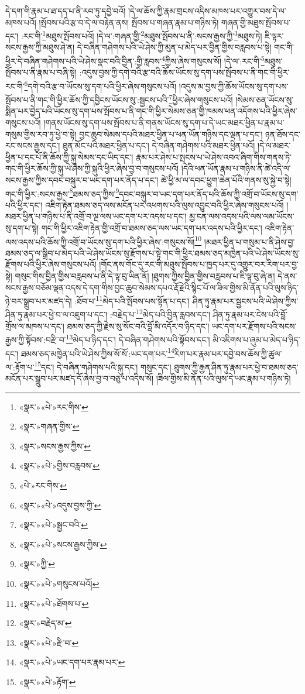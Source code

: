 དེ་དག་གི་རྣམ་པ་ཐ་དད་པ་ནི་རབ་ཏུ་དབྱེ་བའོ། །དེ་ལ་ཆོས་ཀྱི་རྣམ་གྲངས་འདིས་མཁས་པར་འགྱུར་བས་དེ་ལ་མཁས་པའོ། །སྤོབས་པའི་རྩ་བ་དེ་ལ་བརྟེན་ནས། སྤོབས་པ་གཞན་རྣམ་པ་གཉིས་ཏེ། གཞན་གྱི་མཐུས་སྤོབས་པ་དང་། :རང་གི་\footnote{«སྣར་»«པེ་»རང་གིས་}མཐུས་སྤོབས་པའོ། །དེ་ལ་:གཞན་གྱི་\footnote{«སྣར་»གཞན་གྱིས་}མཐུས་སྤོབས་པ་ནི་:སངས་རྒྱས་ཀྱི་\footnote{«སྣར་»སངས་རྒྱས་ཀྱིས་}མཐུས་ཏེ། ཇི་ལྟར་སངས་རྒྱས་ཀྱི་མཐུས་ཤེ་ན། དེ་བཞིན་གཤེགས་པའི་ཡེ་ཤེས་ཀྱི་མུན་པ་མེད་པར་བྱིན་གྱིས་བརླབས་པ་སྟེ། གང་གི་ཕྱིར་དེ་བཞིན་གཤེགས་པའི་ཡེ་ཤེས་སྣང་བའི་བྱིན་:གྱི་རླབས་\footnote{«སྣར་»«པེ་»གྱིས་བརླབས་}ཀྱིས་ཞེས་གསུངས་སོ། །དེ་ལ་:རང་གི་\footnote{«པེ་»རང་གིས་}མཐུས་སྤོབས་པ་ནི་རྣམ་པ་བཞི་སྟེ། :འདུས་བྱས་ཀྱི་དགེ་བའི་རྩ་བའི་ཆོས་ཡོངས་སུ་དག་པས་སྤོབས་པ་ནི་གང་གི་ཕྱིར་རང་གི་\footnote{«སྣར་»«པེ་»འདུས་བྱས་ཀྱི་}དགེ་བའི་རྩ་བ་ཡོངས་སུ་དག་པའི་ཕྱིར་ཞེས་གསུངས་པའོ། །འདུས་མ་བྱས་ཀྱི་ཆོས་ཡོངས་སུ་དག་པས་སྤོབས་པ་ནི་གང་གི་ཕྱིར་ཆོས་ཀྱི་དབྱིངས་ཡོངས་སུ་:སྦྱངས་པའི་\footnote{«སྣར་»«པེ་»སྦྱང་བའི་}ཕྱིར་ཞེས་གསུངས་པའོ། །སེམས་ཅན་ཡོངས་སུ་སྨིན་པར་བྱེད་པའི་ཡོངས་སུ་དག་པས་སྤོབས་པ་ནི་གང་གི་ཕྱིར་སེམས་ཅན་གྱི་ཁམས་ཕན་འདོགས་པའི་ཕྱིར་ཞེས་གསུངས་པའོ། །གནས་ཡོངས་སུ་དག་པས་སྤོབས་པ་ནི་གནས་ཡོངས་སུ་དག་པ་དེ་ཡང་མཐར་ཕྱིན་པ་རྣམ་པ་གསུམ་གྱིས་རབ་ཏུ་ཕྱེ་བ་སྟེ། བྱང་ཆུབ་སེམས་དཔའི་མཐར་ཕྱིན་པ་ཕན་ཡོན་གཉིས་དང་ལྡན་པ་དང་། ཉན་ཐོས་དང་རང་སངས་རྒྱས་དང་། ཐུན་མོང་པའི་མཐར་ཕྱིན་པ་དང་། དེ་བཞིན་གཤེགས་པའི་མཐར་ཕྱིན་པའོ། །དེ་ལ་མཐར་ཕྱིན་པ་དང་པོ་ནི་ཆོས་ཀྱི་སྐུ་སེམས་དང་ཡིད་དང་། རྣམ་པར་ཤེས་པ་སྤངས་པ་ཡེ་ཤེས་འབའ་ཞིག་གིས་གནས་ཏེ་གང་གི་ཕྱིར་ཆོས་ཀྱི་སྐུ་ཡེ་ཤེས་ཀྱི་སྐུའི་ཕྱིར་ཞེས་བྱ་བ་གསུངས་པའོ། །དེའི་ཕན་ཡོན་རྣམ་པ་གཉིས་ནི་ཚེ་འདི་ལ་སངས་རྒྱས་ཀྱིས་དབང་བསྐུར་བ་ཡང་དག་པར་ནོད་པ་དང་། ཚེ་ཕྱི་མ་ལ་དབང་ཕྱུག་ཆེན་པོའི་གནས་སུ་སྐྱེ་བ་སྟེ། གང་གི་ཕྱིར་:སངས་རྒྱས་\footnote{«སྣར་»«པེ་»སངས་རྒྱས་ཀྱིས་}ཐམས་ཅད་ཀྱིས་\footnote{«སྣར་»ཀྱི་}དབང་བསྐུར་བ་ཡང་དག་པར་ནོད་པའི་ཆོས་ཀྱི་འགྲོ་བ་ཡོངས་སུ་དག་པའི་ཕྱིར་དང་། འཇིག་རྟེན་ཐམས་ཅད་ལས་མངོན་པར་འཕགས་པའི་ལུས་འབྱུང་བའི་ཕྱིར་ཞེས་གསུངས་པའོ། །མཐར་ཕྱིན་པ་གཉིས་པ་ནི་འགྲོ་བ་ལྔ་ལས་ཡང་དག་པར་འདས་པ་དང་། མྱ་ངན་ལས་འདས་པའི་ལས་ལམ་ཡོངས་སུ་དག་པ་སྟེ། གང་གི་ཕྱིར་འཇིག་རྟེན་གྱི་འགྲོ་བ་ཐམས་ཅད་ལས་ཡང་དག་པར་འདས་པའི་ཕྱིར་དང་། འཇིག་རྟེན་ལས་འདས་པའི་ཆོས་ཀྱི་འགྲོ་བ་ཡོངས་སུ་དག་པའི་ཕྱིར་ཞེས་:གསུངས་སོ།\footnote{«སྣར་»«པེ་»གསུངས་པའོ།} །མཐར་ཕྱིན་པ་གསུམ་པ་ནི་ཤེས་བྱ་ཐམས་ཅད་ལ་སྒྲིབ་པ་མེད་པའི་ཡེ་ཤེས་ཡོངས་སུ་རྫོགས་པ་སྟེ་གང་གི་ཕྱིར་ཐམས་ཅད་མཁྱེན་པའི་ཡེ་ཤེས་ཡོངས་སུ་རྫོགས་པའི་ཕྱིར་ཞེས་གསུངས་པའོ། །གོང་ནས་གོང་དུ་རང་གི་མཐུས་སྤོབས་པ་ཁྱད་པར་དུ་འགྱུར་བར་རིག་པར་བྱ་སྟེ། གསུང་གིས་བྱིན་གྱིས་བརླབས་པ་ནི་དེ་ལྟ་བུ་ཡིན་ནོ། །ཐུགས་ཀྱིས་བྱིན་གྱིས་བརླབས་པ་ཇི་ལྟ་བུ་ཞེ་ན། དེ་ནས་སངས་རྒྱས་བཅོམ་ལྡན་འདས་དེ་དག་གིས་བྱང་ཆུབ་སེམས་དཔའ་རྡོ་རྗེའི་སྙིང་པོ་ལ་ཟིལ་གྱིས་མི་ནོན་པའི་ལུས་ཉིད་ཉེ་བར་སྒྲུབ་པར་མཛད་དེ། :ཐོབ་པ་\footnote{«སྣར་»«པེ་»ཐོགས་པ་}མེད་པའི་སྤོབས་པས་སྟོན་པ་དང་། ཤིན་ཏུ་རྣམ་པར་སྦྱངས་པའི་ཡེ་ཤེས་ཀྱིས་ཤིན་ཏུ་རྣམ་པར་ཕྱེ་བ་ལ་འཇུག་པ་དང་། :བརྗེད་པ་\footnote{«སྣར་»བརྗེད་མ་}མེད་པའི་བྱིན་རླབས་དང་། ཤིན་ཏུ་རྣམ་པར་ངེས་པའི་བློ་གྲོས་ལ་མཁས་པ་དང་། ཐམས་ཅད་ཀྱི་རྗེས་སུ་སོང་བའི་བློ་མི་འདོར་བ་ཉིད་དང་། ཡང་དག་པར་རྫོགས་པའི་སངས་རྒྱས་ཀྱི་སྟོབས་:བརྫི་བ་\footnote{«སྣར་»«པེ་»རྫི་བ་}མེད་པ་ཉིད་དང་། དེ་བཞིན་གཤེགས་པའི་སྟོབས་དང་། མི་འཇིགས་པ་ཞུམ་པ་མེད་པ་ཉིད་དང་། ཐམས་ཅད་མཁྱེན་པའི་ཡེ་ཤེས་ཀྱིས་སོ་སོ་:ཡང་དག་པར་\footnote{«སྣར་»«པེ་»ཡང་དག་པར་རྣམ་པར་}རིག་པར་རྣམ་པར་དབྱེ་བས་ཆོས་ཀྱི་ཚུལ་ལ་:རྟོག་པ་\footnote{«སྣར་»«པེ་»རྟོག་}དང་། དེ་བཞིན་གཤེགས་པའི་སྐུ་དང་། གསུང་དང་། ཐུགས་ཀྱི་རྒྱན་ཤིན་ཏུ་རྣམ་པར་ཕྱེ་བ་ཐམས་ཅད་མངོན་པར་སྒྲུབ་པར་མཛད་དོ་ཞེས་བྱ་བ་བཅུ་པ་འདིས་སོ། །ཟིལ་གྱིས་མི་ནོན་པའི་ལུས་དེ་ཡང་རྣམ་པ་གཉིས་ཏེ། 